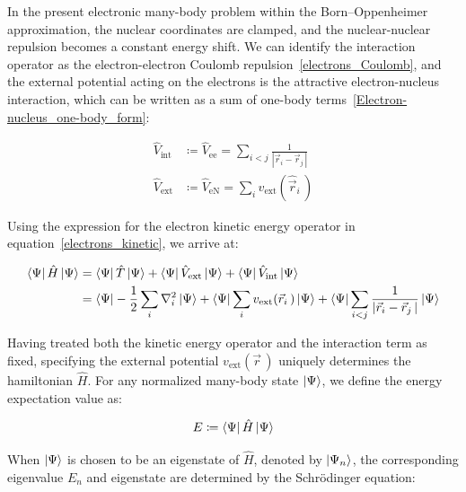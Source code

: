 In the present electronic many-body problem within the Born--Oppenheimer approximation, 
the nuclear coordinates are clamped, and the nuclear-nuclear repulsion becomes a constant energy shift. 
We can identify the interaction operator as the electron-electron Coulomb repulsion~\eqref{electrons_Coulomb},
and the external potential acting on the electrons is the attractive electron-nucleus interaction, which can be written as a sum of one-body terms~\eqref{Electron-nucleus_one-body_form}:

\begin{equation}
\begin{aligned}
    \hat{V}_\mathrm{int} &\coloneqq \hat{V}_{\mathrm{ee}}
    = \sum_{i<j}\frac{1}{|\vec{r}_i-\vec{r}_j\,|} \\
    \hat{V}_\mathrm{ext} &\coloneqq \hat{V}_{\mathrm{eN}}
    =\sum_i v_\mathrm{ext}(\hat{\vec{r}}_i\,)
\end{aligned}
\label{reduced_operator_definition}
\end{equation}

Using the expression for the electron kinetic energy operator in equation~\eqref{electrons_kinetic}, we arrive at:

\begin{equation}
\begin{aligned}
    \bra{\Psi}\hat{H}\ket{\Psi} &= \bra{\Psi}\hat{T}\ket{\Psi} + \bra{\Psi}\hat{V}_\mathrm{ext}\ket{\Psi} + \bra{\Psi}\hat{V}_\mathrm{int}\ket{\Psi} \\
    &= \bra{\Psi}-\frac{1}{2}\sum_i\nabla_i^2\ket{\Psi}
    + \bra{\Psi}\sum_i v_{\mathrm{ext}}(\vec{r}_i\,)\ket{\Psi}
    + \bra{\Psi}\sum_{i<j}\frac{1}{|\vec{r}_i-\vec{r}_j\,|}\ket{\Psi}
\end{aligned}
\label{approx}
\end{equation}

Having treated both the kinetic energy operator and the interaction term as fixed, specifying the external potential $v_\mathrm{ext}(\vec{r}\,)$ uniquely determines the hamiltonian $\hat{H}$.
For any normalized many-body state $\ket{\Psi}$, we define the energy expectation value as:

\begin{equation}
    E \coloneqq \bra{\Psi}\hat{H}\ket{\Psi}
\label{energy_expectation_value_definition}
\end{equation}

When $\ket{\Psi}$ is chosen to be an eigenstate of $\hat{H}$, denoted by $\ket{\Psi_n}$,
the corresponding eigenvalue $E_n$ and eigenstate are determined by the Schrödinger equation:

